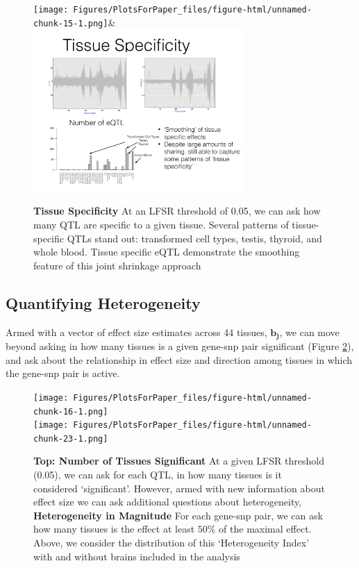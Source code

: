 \newline
\begin{figure}[htbp]
\begin{center}
\texttt{[image: Figures/PlotsForPaper\_files/figure-html/unnamed-chunk-15-1.png]}&
\includegraphics[width=8cm]{Figures/tspecsmooth.pdf}
\end{center}
\caption{\textbf{Tissue Specificity} At an LFSR threshold of 0.05, we can ask how many QTL are specific to a given tissue. Several patterns of tissue-specific QTLs stand out: transformed cell types, testis, thyroid, and whole blood. Tissue specific eQTL demonstrate the smoothing feature of this joint shrinkage approach}
\label{fig:tspec}
\end{figure}\newline




\subsection{Quantifying Heterogeneity}


Armed with a vector of effect size estimates across 44 tissues, $\bm{b_{j}}$, we can move beyond asking in how many tissues is a given gene-snp pair significant (Figure \ref{fig:het}), and ask about the relationship in effect size and direction among tissues in which the gene-snp pair is active.


\newline
\begin{figure}[htbp]
\texttt{[image: Figures/PlotsForPaper\_files/figure-html/unnamed-chunk-16-1.png]}\\
\texttt{[image: Figures/PlotsForPaper\_files/figure-html/unnamed-chunk-23-1.png]}\\
\caption{\textbf{Top: Number of Tissues Significant} At a given LFSR threshold (0.05), we can ask for each QTL, in how many tissues is it considered `significant'. However, armed with new information about effect size we can ask additional questions about heterogeneity, \textbf{Heterogeneity in Magnitude} For each gene-snp pair, we can ask how many tissues is the effect at least $50\%$ of the maximal effect. Above, we consider the distribution of this `Heterogeneity Index' with and without brains included in the analysis}
\label{fig:het}
\end{figure}\newline



